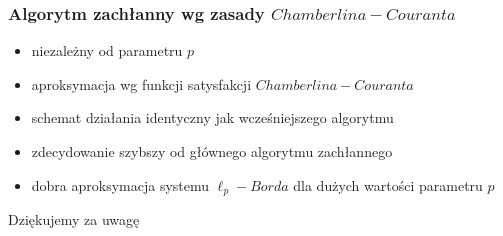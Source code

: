 \documentclass{beamer}
\begin{document}
\begin{frame}
\frametitle{Algorytm zachłanny wg zasady $Chamberlina-Couranta$}
\begin{itemize}
\item niezależny od parametru $p$
\item aproksymacja wg funkcji satysfakcji $Chamberlina-Couranta$
\item schemat działania identyczny jak wcześniejszego algorytmu
\item zdecydowanie szybszy od głównego algorytmu zachłannego
\item dobra aproksymacja systemu $\ell_p-Borda$ dla dużych wartości parametru $p$   
\end{itemize}

\end{frame}

\begin{frame}
\Huge{\centerline{Dziękujemy za uwagę}}
\end{frame}

\end{document}
